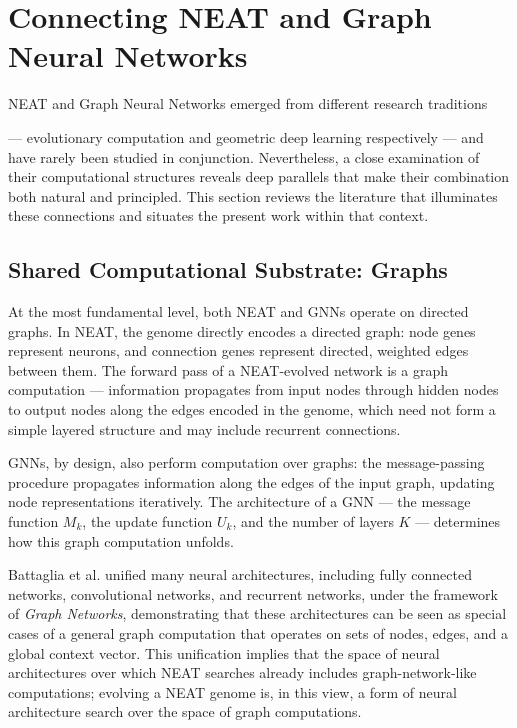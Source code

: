 \section{Connecting NEAT and Graph Neural Networks}

NEAT and Graph Neural Networks emerged from different research traditions 




--- evolutionary computation and geometric deep learning respectively --- and have rarely been studied in conjunction. Nevertheless, a close examination of their computational structures reveals deep parallels that make their combination both natural and principled. This section reviews the literature that illuminates these connections and situates the present work within that context.

\subsection{Shared Computational Substrate: Graphs}

At the most fundamental level, both NEAT and GNNs operate on directed graphs. In NEAT, the genome directly encodes a directed graph: node genes represent neurons, and connection genes represent directed, weighted edges between them. The forward pass of a NEAT-evolved network is a graph computation --- information propagates from input nodes through hidden nodes to output nodes along the edges encoded in the genome, which need not form a simple layered structure and may include recurrent connections.

GNNs, by design, also perform computation over graphs: the message-passing procedure propagates information along the edges of the input graph, updating node representations iteratively. The architecture of a GNN --- the message function $M_k$, the update function $U_k$, and the number of layers $K$ --- determines how this graph computation unfolds.

Battaglia et al. \cite{battaglia2018relational} unified many neural architectures, including fully connected networks, convolutional networks, and recurrent networks, under the framework of \textit{Graph Networks}, demonstrating that these architectures can be seen as special cases of a general graph computation that operates on sets of nodes, edges, and a global context vector. This unification implies that the space of neural architectures over which NEAT searches already includes graph-network-like computations; evolving a NEAT genome is, in this view, a form of neural architecture search over the space of graph computations.

